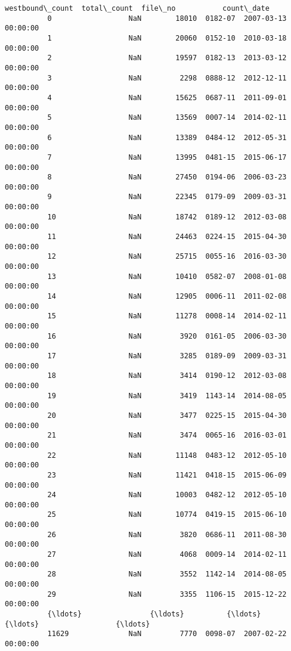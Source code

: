 \documentclass[11pt]{article}
\begin{document}
\begin{Verbatim}[commandchars=\\\{\}]
                 westbound\_count  total\_count  file\_no           count\_date  
          0                  NaN        18010  0182-07  2007-03-13 00:00:00  
          1                  NaN        20060  0152-10  2010-03-18 00:00:00  
          2                  NaN        19597  0182-13  2013-03-12 00:00:00  
          3                  NaN         2298  0888-12  2012-12-11 00:00:00  
          4                  NaN        15625  0687-11  2011-09-01 00:00:00  
          5                  NaN        13569  0007-14  2014-02-11 00:00:00  
          6                  NaN        13389  0484-12  2012-05-31 00:00:00  
          7                  NaN        13995  0481-15  2015-06-17 00:00:00  
          8                  NaN        27450  0194-06  2006-03-23 00:00:00  
          9                  NaN        22345  0179-09  2009-03-31 00:00:00  
          10                 NaN        18742  0189-12  2012-03-08 00:00:00  
          11                 NaN        24463  0224-15  2015-04-30 00:00:00  
          12                 NaN        25715  0055-16  2016-03-30 00:00:00  
          13                 NaN        10410  0582-07  2008-01-08 00:00:00  
          14                 NaN        12905  0006-11  2011-02-08 00:00:00  
          15                 NaN        11278  0008-14  2014-02-11 00:00:00  
          16                 NaN         3920  0161-05  2006-03-30 00:00:00  
          17                 NaN         3285  0189-09  2009-03-31 00:00:00  
          18                 NaN         3414  0190-12  2012-03-08 00:00:00  
          19                 NaN         3419  1143-14  2014-08-05 00:00:00  
          20                 NaN         3477  0225-15  2015-04-30 00:00:00  
          21                 NaN         3474  0065-16  2016-03-01 00:00:00  
          22                 NaN        11148  0483-12  2012-05-10 00:00:00  
          23                 NaN        11421  0418-15  2015-06-09 00:00:00  
          24                 NaN        10003  0482-12  2012-05-10 00:00:00  
          25                 NaN        10774  0419-15  2015-06-10 00:00:00  
          26                 NaN         3820  0686-11  2011-08-30 00:00:00  
          27                 NaN         4068  0009-14  2014-02-11 00:00:00  
          28                 NaN         3552  1142-14  2014-08-05 00:00:00  
          29                 NaN         3355  1106-15  2015-12-22 00:00:00  
          {\ldots}                {\ldots}          {\ldots}      {\ldots}                  {\ldots}  
          11629              NaN         7770  0098-07  2007-02-22 00:00:00  

\end{Verbatim}
\end{document}
